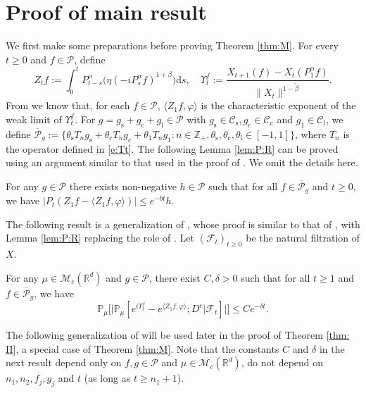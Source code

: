 \documentclass{amse-new}
\numberwithin{equation}{section}
\begin{document}
\section{Proof of main result}
\label{proofs of main results}
	We first make some preparations before proving Theorem \ref{thm:M}.
	For every $t\geq 0$ and $f\in \mathcal P$, define
\[
  	Z_t f
  	:= \int_0^t P^\alpha_{t-s}\big( \eta (-i P^\alpha_sf)^{1+\beta}\big)\mathrm ds,
  	\quad \Upsilon^f_t
   	:= \frac{X_{t+1} (f) - X_t(P_1^\alpha f)}{\| X_t\|^{1-\tilde \beta}}.
\]
From
	\cite[Theorem 3.4]{RenSongSunZhao2019Stable} we know that, for each $f\in \mathcal P$, $\langle Z_1f,\varphi\rangle$ is the characteristic exponent of
the weak limit of $\Upsilon^f_t$.
	For $g = g_\mathrm s + g_\mathrm c + g_\mathrm l\in \mathcal P$ with $g_\mathrm s \in \mathcal C_\mathrm s, g_\mathrm c \in \mathcal C_\mathrm c$ and $g_\mathrm 1 \in \mathcal C_\mathrm l$, we define $\overline {\mathcal P}_g:= \{\theta_\mathrm s T_n g_\mathrm s +  \theta_\mathrm c T_n g_\mathrm c + \theta_\mathrm 1 T_n g_\mathrm 1: n \in \mathbb Z_+, \theta_\mathrm s, \theta_\mathrm c, \theta_\mathrm l \in [-1,1]\}$, where $T_n$ is the operator defined in \eqref{e:Tt}.
	The following Lemma \ref{lem:P:R} can be proved using
an argument similar to that used in the proof of
	\cite[Lemma 2.9]{RenSongSunZhao2019Stable}. We omit the details here.
\begin{lemma}
\label{lem:P:R}
	For any $g\in \mathcal P$ there exists non-negative $h \in \mathcal P$ such that for all $ f \in \overline {\mathcal P}_g$ and $t\geq 0$, we have $ | P_t (Z_1 f - \langle Z_1 f, \varphi \rangle )| \leq e^{-bt} h$.
\end{lemma}

	The following result is a generalization of \cite[Proposition 3.5]{RenSongSunZhao2019Stable}, whose proof is similar to that of \cite[Proposition 3.5]{RenSongSunZhao2019Stable},
with Lemma \ref{lem:P:R} replacing the role of \cite[Lemma 2.9]{RenSongSunZhao2019Stable}.
	Let $(\mathscr F_t)_{t\geq 0}$ be the natural filtration of $X$.
	\begin{proposition}
\label{thm:Key}
	For any $\mu \in \mathcal M_c(\mathbb R^d)$  and $g \in \mathcal P$, there exist $C,\delta>0$ such that for all $t\geq 1$ and $f \in \overline{\mathcal P}_g$, we have
\[
	\mathbb P_\mu
	\Big[ \big|\mathbb P_\mu [e^{i\Upsilon^f_t} - e^{\langle Z_1f, \varphi\rangle}; D^c | \mathscr F_t ]  \big|\Big]
	\leq C e^{- \delta t}.
\]
\end{proposition}

	The following generalization of \cite[Proposition 3.5]{RenSongSunZhao2019Stable} will be used later in the proof of  Theorem \ref{thm: II}, a special case of Theorem \ref{thm:M}.
	Note that the constants $C$ and $\delta$ in the next result depend only on $f,g\in \mathcal P$ and $\mu\in \mathcal M_c(\mathbb R^d)$, do not depend on $n_1, n_2, f_j, g_j$ and $t$ (as long as $t\geq n_1+1$).
\end{document}
